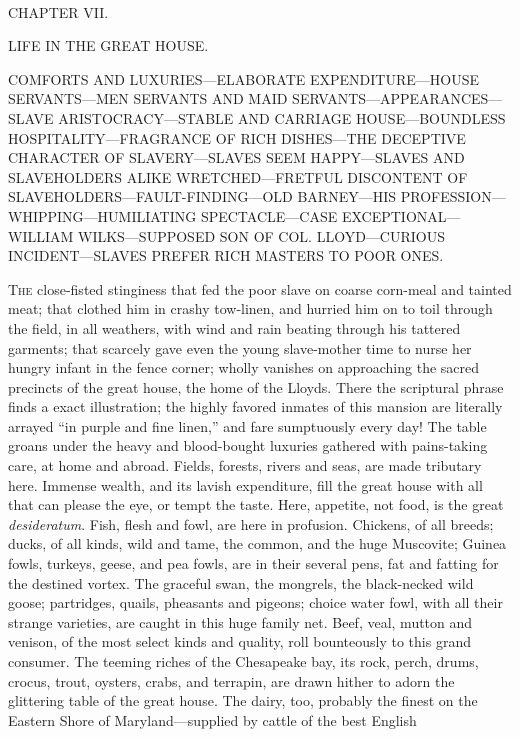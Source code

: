 {}

~

{CHAPTER VII.}

LIFE IN THE GREAT HOUSE.

{COMFORTS AND LUXURIES---ELABORATE EXPENDITURE---HOUSE SERVANTS---MEN
SERVANTS AND MAID SERVANTS---APPEARANCES---SLAVE ARISTOCRACY---STABLE
AND CARRIAGE HOUSE---BOUNDLESS HOSPITALITY---FRAGRANCE OF RICH
DISHES---THE DECEPTIVE CHARACTER OF SLAVERY---SLAVES SEEM HAPPY---SLAVES
AND SLAVEHOLDERS ALIKE WRETCHED---FRETFUL DISCONTENT OF
SLAVEHOLDERS---FAULT-FINDING---OLD BARNEY---HIS
PROFESSION---WHIPPING---HUMILIATING SPECTACLE---CASE
EXCEPTIONAL---WILLIAM WILKS---SUPPOSED SON OF COL. LLOYD---CURIOUS
INCIDENT---SLAVES PREFER RICH MASTERS TO POOR ONES.}

\textsc{The} close-fisted stinginess that fed the poor slave on coarse
corn-meal and tainted meat; that clothed him in crashy tow-linen, and
hurried him on to toil through the field, in all weathers, with wind and
rain beating through his tattered garments; that scarcely gave even the
young slave-mother time to nurse her hungry infant in the fence corner;
wholly vanishes on approaching the sacred precincts of the great house,
the home of the Lloyds. There the scriptural phrase finds a exact
illustration; the highly favored inmates of this mansion are literally
arrayed ``in purple and fine linen,'' and fare sumptuously every day!
The table groans under the heavy and blood-bought luxuries gathered with
pains-taking care, at home and abroad. Fields, forests, rivers and seas,
are made tributary here. Immense wealth, and its lavish expenditure,
fill the great house with all that can please the {}eye, or tempt the
taste. Here, appetite, not food, is the great \emph{desideratum}. Fish,
flesh and fowl, are here in profusion. Chickens, of all breeds; ducks,
of all kinds, wild and tame, the common, and the huge Muscovite; Guinea
fowls, turkeys, geese, and pea fowls, are in their several pens, fat and
fatting for the destined vortex. The graceful swan, the mongrels, the
black-necked wild goose; partridges, quails, pheasants and pigeons;
choice water fowl, with all their strange varieties, are caught in this
huge family net. Beef, veal, mutton and venison, of the most select
kinds and quality, roll bounteously to this grand consumer. The teeming
riches of the Chesapeake bay, its rock, perch, drums, crocus, trout,
oysters, crabs, and terrapin, are drawn hither to adorn the glittering
table of the great house. The dairy, too, probably the finest on the
Eastern Shore of Maryland---supplied by cattle of the best English
